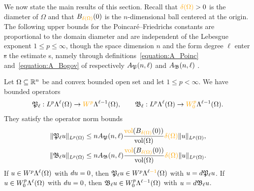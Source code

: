 \documentclass[10pt,letterpaper]{article}
\newcommand\cye[1]{%
  \protect\leavevmode
  \begingroup
    \color{red!35!yellow}%
    #1%
  \endgroup
}
\begin{document}
We now state the main results of this section. \cye{Recall that $\cye{\diam(\Omega)} > 0$ is the diameter of $\Omega$ and that $B_{\cye{\diam(\Omega)}}(0)$ is the $n$-dimensional ball centered at the origin.} The \cye{following} upper bounds for the Poincar\'e--Friedrichs \cye{constants} \cye{are} proportional to the domain diameter and are independent of the Lebesgue exponent $1 \leq p \leq \infty$,
though the \cye{space} dimension \cye{$n$} and the form degree \cye{$\ell$} enter\cye{\sout{s}} the estimate\cye{s, namely through definitions~\eqref{equation:A_Poinc} and~\eqref{equation:A_Bogov} of respectively $A_{{\mathfrak P}}(n,\ell)$ and $A_{{\mathfrak B}}(n,\ell)$}. 

\begin{theorem}\label{theorem:PF_EC}
    Let $\Omega \subseteq {\mathbb R}^{n}$ be and convex \cye{bounded open} \cye{set} and let $1 \leq p < \infty$. 
    We have bounded operators 
    \begin{align*}
        \Poinc_{\ell} : L^{p}\Alt^{\ell}(\Omega) \rightarrow \cye{W^{p}}\Alt^{\ell-1}(\Omega)
        ,
        \qquad 
        \Bogov_{\ell} : L^{p}\Alt^{\ell}(\Omega) \rightarrow \cye{W^{p}_{0}}\Alt^{\ell-1}(\Omega)
        .
    \end{align*}
    They satisfy the operator norm bounds 
    \begin{align*}
        \| \Poinc_{\ell} u \|_{L^{p}(\Omega)}
        &\leq 
        n A_{\Poinc}(n,\ell) \frac{ \cye{\vol}(B_{\cye{\diam(\Omega)}}(0)) }{\vol(\Omega)} 
        \cye{\diam(\Omega)}
        \| u \|_{L^{p}(\Omega)}
        ,
        \\
        \| \Bogov_{\ell} u \|_{L^{p}(\Omega)}
        &\leq 
        n A_{\Bogov}(n,\ell) \frac{ \cye{\vol}(B_{\cye{\diam(\Omega)}}(0)) }{\vol(\Omega)} 
        \cye{\diam(\Omega)}
        \| u \|_{L^{p}(\Omega)}
        .
    \end{align*}
    If $u \in W^{p}    \Lambda^{\ell}(\Omega)$ with $d u = 0$, then $\Poinc_{\ell} u \in W^{p}    \Alt^{\ell \cye{-1}}(\Omega)$ with $u = d {\mathfrak P}_{\ell} u$.
    If $u \in W^{p}_{0}\Lambda^{\ell}(\Omega)$ with $d u = 0$, then ${\mathfrak B}_{\ell} u \in W^{p}_{0}\Lambda^{\ell-1}(\Omega)$ with $u = d {\mathfrak B}_{\ell} u$.
\end{theorem}

\end{document}
